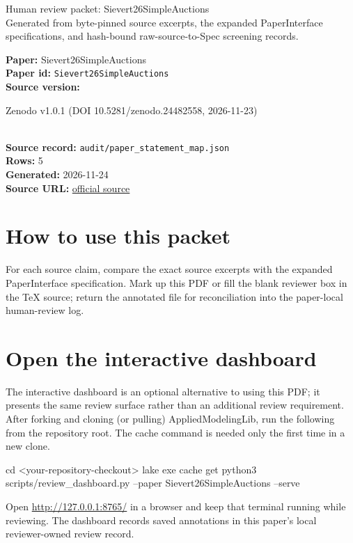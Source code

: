 \documentclass[10pt]{article}
\begin{document}
\fontsize{9}{10}\selectfont

\begin{center}
{\LARGE Human review packet: Sievert26SimpleAuctions}\\[0.35em]
\small Generated from byte-pinned source excerpts, the expanded PaperInterface
specifications, and hash-bound raw-source-to-Spec screening records.
\end{center}

\noindent\textbf{Paper:} Sievert26SimpleAuctions\\
\textbf{Paper id:} \texttt{Sievert26SimpleAuctions}\\
\textbf{Source version:} \parbox[t]{0.76\linewidth}{\raggedright Zenodo v1.0.1 (DOI 10.5281/zenodo.24482558, 2026-11-23)}\\
\textbf{Source record:} \texttt{audit/paper\_statement\_map.json}\\
\textbf{Rows:} 5\\
\textbf{Generated:} 2026-11-24\\
\textbf{Source URL:} \href{https://doi.org/10.5281/zenodo.24482558}{official source}





\section*{How to use this packet}
For each source claim, compare the exact source excerpts with the expanded
PaperInterface specification. Mark up this PDF or fill the blank reviewer box in the TeX source;
return the annotated file for reconciliation into the paper-local human-review
log.

\section*{Open the interactive dashboard}
The interactive dashboard is an optional alternative to using this PDF; it
presents the same review surface rather than an additional review requirement.
After forking and cloning (or pulling) AppliedModelingLib, run the following from the
repository root. The cache command is needed only the first time in a new clone.
\begin{ReviewVerbatim}
cd <your-repository-checkout>
lake exe cache get
python3 scripts/review_dashboard.py --paper Sievert26SimpleAuctions --serve
\end{ReviewVerbatim}
Open \url{http://127.0.0.1:8765/} in a browser and keep that terminal running
while reviewing. The dashboard records saved annotations in this paper's local
reviewer-owned review record.
\end{document}

